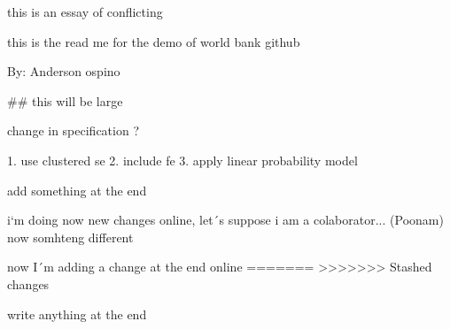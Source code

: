 
this is an essay of conflicting

this is the read me for the demo of world bank github

By: Anderson ospino

## this will be large



change in specification ?

1. use clustered se
2. include fe
3. apply linear probability model

add something at the end








i`m doing now new changes online, let´s suppose i am a colaborator... (Poonam)
now somhteng different


now I´m adding a change at the end online
=======
>>>>>>> Stashed changes

write anything at the end
